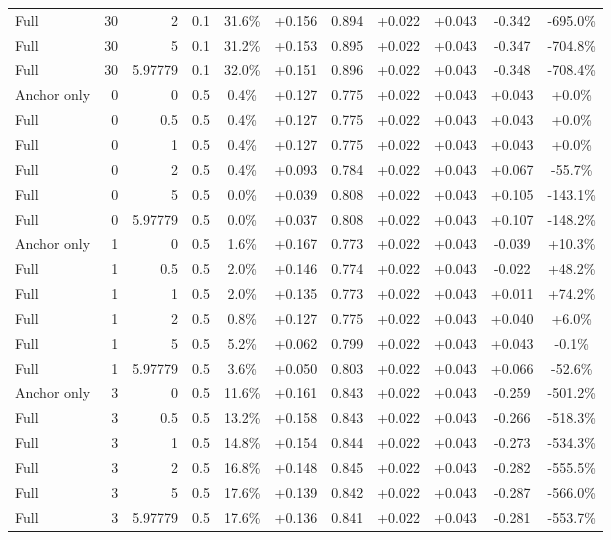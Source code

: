 \begin{table}[htbp]
\begin{tabular}{lrrrccccccc}
Full & 30 & 2 & 0.1 & 31.6\% & +0.156 & 0.894 & +0.022 & +0.043 & -0.342 & -695.0\% \\
Full & 30 & 5 & 0.1 & 31.2\% & +0.153 & 0.895 & +0.022 & +0.043 & -0.347 & -704.8\% \\
Full & 30 & 5.97779 & 0.1 & 32.0\% & +0.151 & 0.896 & +0.022 & +0.043 & -0.348 & -708.4\% \\
Anchor only & 0 & 0 & 0.5 & 0.4\% & +0.127 & 0.775 & +0.022 & +0.043 & +0.043 & +0.0\% \\
Full & 0 & 0.5 & 0.5 & 0.4\% & +0.127 & 0.775 & +0.022 & +0.043 & +0.043 & +0.0\% \\
Full & 0 & 1 & 0.5 & 0.4\% & +0.127 & 0.775 & +0.022 & +0.043 & +0.043 & +0.0\% \\
Full & 0 & 2 & 0.5 & 0.4\% & +0.093 & 0.784 & +0.022 & +0.043 & +0.067 & -55.7\% \\
Full & 0 & 5 & 0.5 & 0.0\% & +0.039 & 0.808 & +0.022 & +0.043 & +0.105 & -143.1\% \\
Full & 0 & 5.97779 & 0.5 & 0.0\% & +0.037 & 0.808 & +0.022 & +0.043 & +0.107 & -148.2\% \\
Anchor only & 1 & 0 & 0.5 & 1.6\% & +0.167 & 0.773 & +0.022 & +0.043 & -0.039 & +10.3\% \\
Full & 1 & 0.5 & 0.5 & 2.0\% & +0.146 & 0.774 & +0.022 & +0.043 & -0.022 & +48.2\% \\
Full & 1 & 1 & 0.5 & 2.0\% & +0.135 & 0.773 & +0.022 & +0.043 & +0.011 & +74.2\% \\
Full & 1 & 2 & 0.5 & 0.8\% & +0.127 & 0.775 & +0.022 & +0.043 & +0.040 & +6.0\% \\
Full & 1 & 5 & 0.5 & 5.2\% & +0.062 & 0.799 & +0.022 & +0.043 & +0.043 & -0.1\% \\
Full & 1 & 5.97779 & 0.5 & 3.6\% & +0.050 & 0.803 & +0.022 & +0.043 & +0.066 & -52.6\% \\
Anchor only & 3 & 0 & 0.5 & 11.6\% & +0.161 & 0.843 & +0.022 & +0.043 & -0.259 & -501.2\% \\
Full & 3 & 0.5 & 0.5 & 13.2\% & +0.158 & 0.843 & +0.022 & +0.043 & -0.266 & -518.3\% \\
Full & 3 & 1 & 0.5 & 14.8\% & +0.154 & 0.844 & +0.022 & +0.043 & -0.273 & -534.3\% \\
Full & 3 & 2 & 0.5 & 16.8\% & +0.148 & 0.845 & +0.022 & +0.043 & -0.282 & -555.5\% \\
Full & 3 & 5 & 0.5 & 17.6\% & +0.139 & 0.842 & +0.022 & +0.043 & -0.287 & -566.0\% \\
Full & 3 & 5.97779 & 0.5 & 17.6\% & +0.136 & 0.841 & +0.022 & +0.043 & -0.281 & -553.7\% \\

\end{tabular}
\end{table}
